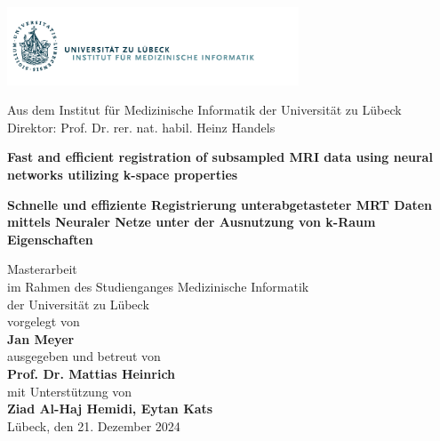 
\addtolength{\topmargin}{-1.2cm} 
\addtolength{\textwidth}{2.35cm} 

\vspace*{-2.7cm}
\hspace*{-2cm}
\includegraphics[width=0.65\textwidth]{./images/Logo_IMI}
\vspace*{0.4cm}
\begin{center}


\enlargethispage{5cm}
Aus dem Institut für Medizinische Informatik 
der Universität zu Lübeck\\
Direktor: Prof. Dr. rer. nat. habil. Heinz Handels\\[1.8cm]

\begin{Large}
\textcolor{Ocean}{{\textbf{Fast and efficient registration of subsampled MRI data using neural networks utilizing k-space properties} }}\\ 
\end{Large}
\vspace*{1.5cm}
\begin{large}
{{\textbf{Schnelle und effiziente Registrierung unterabgetasteter MRT Daten mittels Neuraler Netze unter der Ausnutzung von k-Raum Eigenschaften} }}\\ 
\end{large}
\vspace*{2.5cm}
%
Masterarbeit\\ 
im Rahmen des Studienganges Medizinische Informatik\\
der Universität zu Lübeck\\[1.0cm]
%
vorgelegt von\\[0.1cm]
\textbf{Jan Meyer}\\[1.0cm]
%
ausgegeben und betreut von\\[0.1cm]
\textbf{Prof. Dr. Mattias Heinrich}\\[0.3cm]
mit Unterstützung von\\[0.1cm]
\textbf{Ziad Al-Haj Hemidi, Eytan Kats}\\[2.8cm]
%
Lübeck, den 21. Dezember 2024
\end{center}
  
